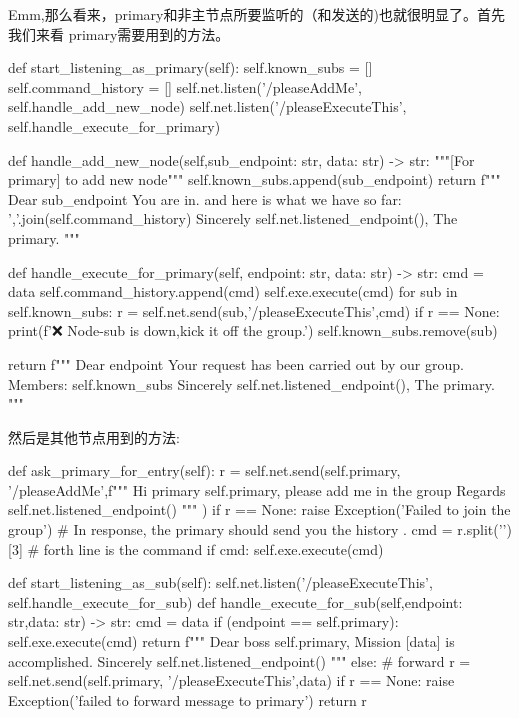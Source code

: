 Emm,那么看来，primary和非主节点所要监听的（和发送的)也就很明显了。首先我们来看
primary需要用到的方法。
\begin{simplepy}
    def start_listening_as_primary(self):
        self.known_subs = []
        self.command_history = []
        self.net.listen('/pleaseAddMe',
                        self.handle_add_new_node)
        self.net.listen('/pleaseExecuteThis',
                        self.handle_execute_for_primary)

    def handle_add_new_node(self,sub_endpoint: str,
                            data: str) -> str:
        """[For primary] to add new node"""
        self.known_subs.append(sub_endpoint)
        return f"""
        Dear {sub_endpoint}
            You are in. and here is what we have so far:
            {','.join(self.command_history)}
                   Sincerely
                   {self.net.listened_endpoint()}, The primary.
        """

    def handle_execute_for_primary(self, endpoint: str,
                                   data: str) -> str:
        cmd = data
        self.command_history.append(cmd)
        self.exe.execute(cmd)
        for sub in self.known_subs:
            r = self.net.send(sub,'/pleaseExecuteThis',cmd)
            if r == None:
                print(f'❌️ Node-{sub} is down,kick it off the group.')
                self.known_subs.remove(sub)

        return f"""
        Dear {endpoint}
             Your request has been carried out by our group.
             Members: {self.known_subs}
                 Sincerely
                 {self.net.listened_endpoint()}, The primary.
        """
\end{simplepy}
然后是其他节点用到的方法:
\begin{simplepy}
    def ask_primary_for_entry(self):
        r = self.net.send(self.primary,
                    '/pleaseAddMe',f"""
                    Hi primary {self.primary},
                       please add me in the group
                          Regards {self.net.listened_endpoint()}
                    """
                          )
        if r == None:
            raise Exception('Failed to join the group')
        # In response, the primary should send you the history .
        cmd = r.split('\n')[3]  # forth line is the command
        if cmd:
            self.exe.execute(cmd)

    def start_listening_as_sub(self):
        self.net.listen('/pleaseExecuteThis',
                        self.handle_execute_for_sub)
    def handle_execute_for_sub(self,endpoint: str,data: str) -> str:
        cmd = data
        if (endpoint == self.primary):
            self.exe.execute(cmd)
            return f"""
            Dear boss {self.primary},
                 Mission [{data}] is accomplished.
                     Sincerely
                     {self.net.listened_endpoint()}
            """
        else:
            # forward
            r = self.net.send(self.primary,
                                 '/pleaseExecuteThis',data)
            if r == None:
                raise Exception('failed to forward message to primary')
            return r
\end{simplepy}
